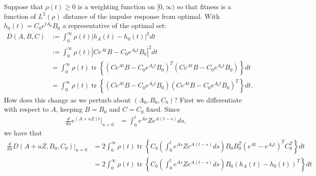 \documentclass{article}
\newcommand{\tr}{\mathop{\mbox{tr}}} %
\newcommand{\1}{\mathbbm{1}}
\begin{document}
Suppose that $\rho(t) \ge 0$ is a weighting function on $[0,\infty)$
so that fitness is a function of $L^2(\rho)$ distance of the impulse response from optimal.
With $h_0(t) = C_0 e^{tA_0} B_0$ a representative of the optimal set:
\begin{equation}
    \begin{aligned}
        D(A, B, C) 
        &:= 
        \int_0^\infty \rho(t) \left| h_A(t) - h_0(t) \right|^2 dt \\
        &:= 
        \int_0^\infty \rho(t) \left| C e^{At} B - C_0 e^{A_0 t} B_0 \right|^2 dt \\
        &= 
        \int_0^\infty \rho(t) \tr\left\{
            \left( C e^{At} B - C_0 e^{A_0 t} B_0 \right)^T
            \left( C e^{At} B - C_0 e^{A_0 t} B_0 \right)
        \right\} dt \\
        &= 
        \int_0^\infty \rho(t) \tr\left\{
            \left( C e^{At} B - C_0 e^{A_0 t} B_0 \right)
            \left( C e^{At} B - C_0 e^{A_0 t} B_0 \right)^T
        \right\} dt  .
    \end{aligned}
\end{equation}
How does this change as we perturb about $(A_0, B_0, C_0)$?
First we differentiate with respect to $A$, keeping $B=B_0$ and $C=C_0$ fixed.
Since
\begin{equation}
  \begin{aligned}
      \frac{d}{du} e^{(A+uZ)t} \vert_{u=0}
      &=
      \int_0^t e^{As} Z e^{A(t-s)} ds, 
  \end{aligned}
\end{equation}
we have that
\begin{equation}
  \begin{aligned}
      \frac{d}{du} D(A+uZ,B_0,C_0)\vert_{u=0}
      &=
        2 \int_0^\infty \rho(t) \tr\left\{ C_0 \left( \int_0^t e^{As} Z e^{A(t-s)} ds \right) B_0 B_0^T \left( e^{At} - e^{A_0 t} \right)^T C_0^T \right\} dt \\
      &=
        2 \int_0^\infty \rho(t) \tr\left\{ C_0 \left( \int_0^t e^{As} Z e^{A(t-s)} ds \right) B_0 \left( h_A(t) - h_0(t) \right)^T \right\} dt 
  \end{aligned}
\end{equation}
\end{document}

